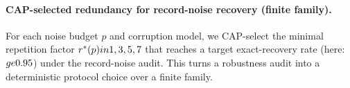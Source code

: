 \paragraph{CAP-selected redundancy for record-noise recovery (finite family).} \AuditTag For each noise budget $p$ and corruption model, we CAP-select the minimal repetition factor $r^\ast(p)\\in\\{1,3,5,7\\}$ that reaches a target exact-recovery rate (here: $\\ge 0.95$) under the record-noise audit. This turns a robustness audit into a deterministic protocol choice over a finite family.